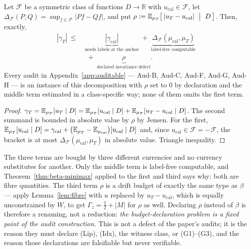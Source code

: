 \begin{proposition}\label{prop:threeterm}
Let $\mathcal F$ be a symmetric class of functions $D\to\mathbb R$ with
$u_{\mathrm{cal}}\in\mathcal F$, let
$\Delta_{\mathcal F}(P,Q)=\sup_{f\in\mathcal F}|Pf-Qf|$, and put
$\rho:=\E_{\mu_T}\bigl[\,|u_T-u_{\mathrm{cal}}|\ \bigm|\ D\,\bigr]$. Then, exactly,
\[
\begin{aligned}
|\gamma_T|\ \le\ &\underbrace{|\gamma_{\mathrm{cal}}|}_{\text{needs labels at the anchor}}
\;+\;\underbrace{\Delta_{\mathcal F}(\mu_{\mathrm{cal}},\mu_T)}_{\text{label-free computable}}\\
&\;+\;\underbrace{\rho}_{\text{declared invariance defect}} .
\end{aligned}
\]
Every audit in Appendix~\ref{app:auditable} --- Aud-B, Aud-C, Aud-F, Aud-G, Aud-H --- is an
instance of this decomposition with $\rho$ set to $0$ by declaration and the middle term
estimated in a class-specific way; none of them omits the first term.
\end{proposition}
\begin{proof}
$\gamma_T=\mathbb{E}_{\mu_T}[u_T\mid D]
=\mathbb{E}_{\mu_T}[u_{\mathrm{cal}}\mid D]+\mathbb{E}_{\mu_T}[u_T-u_{\mathrm{cal}}\mid D]$.
The second summand is bounded in absolute value by $\rho$ by Jensen. For the first,
$\mathbb{E}_{\mu_T}[u_{\mathrm{cal}}\mid D]
=\gamma_{\mathrm{cal}}+\bigl(\mathbb{E}_{\mu_T}-\mathbb{E}_{\mu_{\mathrm{cal}}}\bigr)[u_{\mathrm{cal}}\mid D]$
and, since $u_{\mathrm{cal}}\in\mathcal F=-\mathcal F$, the bracket is at most
$\Delta_{\mathcal F}(\mu_{\mathrm{cal}},\mu_T)$ in absolute value. Triangle inequality.
\end{proof}

\begin{remark}\label{rem:reading}
The three terms are bought by three different currencies and no currency substitutes for
another. Only the middle term is label-free computable, and
Theorem~\ref{thm:beta-minimax} applied to the first and third says why: both are fibre
quantities. The third term $\rho$ is a drift budget of exactly the same type as $\beta$ ---
apply Lemma~\ref{lem:fibre} with $u$ replaced by $u_T-u_{\mathrm{cal}}$, which is equally
unconstrained by $W$, to get $\Gamma_z=\tfrac12+|M|$ for $\rho$ as well. Declaring $\rho$
instead of $\beta$ is therefore a renaming, not a reduction: \emph{the budget-declaration
problem is a fixed point of the audit construction.} This is not a defect of the paper's
audits; it is the reason they must declare (Lip), (Idx), the witness class, or (G1)--(G3),
and the reason those declarations are falsifiable but never verifiable.
\end{remark}

